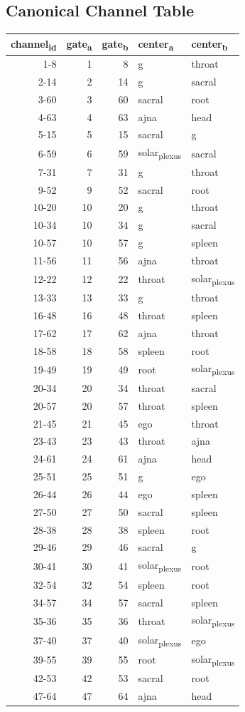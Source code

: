 \documentclass[11pt]{article}
\begin{document}
\subsection{Canonical Channel Table}
\label{sec:org211b370}
\begin{center}
\begin{tabular}{rrrll}
channel\textsubscript{id} & gate\textsubscript{a} & gate\textsubscript{b} & center\textsubscript{a} & center\textsubscript{b}\\
\hline
1-8 & 1 & 8 & g & throat\\
2-14 & 2 & 14 & g & sacral\\
3-60 & 3 & 60 & sacral & root\\
4-63 & 4 & 63 & ajna & head\\
5-15 & 5 & 15 & sacral & g\\
6-59 & 6 & 59 & solar\textsubscript{plexus} & sacral\\
7-31 & 7 & 31 & g & throat\\
9-52 & 9 & 52 & sacral & root\\
10-20 & 10 & 20 & g & throat\\
10-34 & 10 & 34 & g & sacral\\
10-57 & 10 & 57 & g & spleen\\
11-56 & 11 & 56 & ajna & throat\\
12-22 & 12 & 22 & throat & solar\textsubscript{plexus}\\
13-33 & 13 & 33 & g & throat\\
16-48 & 16 & 48 & throat & spleen\\
17-62 & 17 & 62 & ajna & throat\\
18-58 & 18 & 58 & spleen & root\\
19-49 & 19 & 49 & root & solar\textsubscript{plexus}\\
20-34 & 20 & 34 & throat & sacral\\
20-57 & 20 & 57 & throat & spleen\\
21-45 & 21 & 45 & ego & throat\\
23-43 & 23 & 43 & throat & ajna\\
24-61 & 24 & 61 & ajna & head\\
25-51 & 25 & 51 & g & ego\\
26-44 & 26 & 44 & ego & spleen\\
27-50 & 27 & 50 & sacral & spleen\\
28-38 & 28 & 38 & spleen & root\\
29-46 & 29 & 46 & sacral & g\\
30-41 & 30 & 41 & solar\textsubscript{plexus} & root\\
32-54 & 32 & 54 & spleen & root\\
34-57 & 34 & 57 & sacral & spleen\\
35-36 & 35 & 36 & throat & solar\textsubscript{plexus}\\
37-40 & 37 & 40 & solar\textsubscript{plexus} & ego\\
39-55 & 39 & 55 & root & solar\textsubscript{plexus}\\
42-53 & 42 & 53 & sacral & root\\
47-64 & 47 & 64 & ajna & head\\
\end{tabular}
\end{center}
\end{document}

